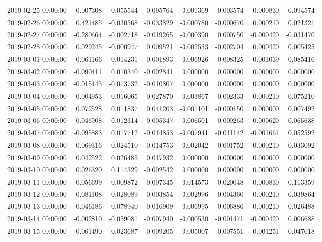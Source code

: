 \begin{tabular}{lrrrrrrr}
2019-02-25 00:00:00 & 0.007308 & 0.055544 & 0.095764 & 0.001369 & 0.003574 & 0.000830 & 0.094574 \\
2019-02-26 00:00:00 & 0.421485 & -0.030568 & -0.033829 & -0.000780 & -0.000670 & 0.000210 & 0.021321 \\
2019-02-27 00:00:00 & -0.280664 & -0.002718 & -0.019265 & -0.000390 & 0.000750 & -0.000420 & -0.031470 \\
2019-02-28 00:00:00 & 0.029245 & -0.000947 & 0.009521 & -0.002533 & -0.002704 & 0.000420 & 0.005425 \\
2019-03-01 00:00:00 & 0.061166 & 0.014231 & 0.001893 & 0.006926 & 0.008325 & 0.001039 & -0.085416 \\
2019-03-02 00:00:00 & -0.090411 & 0.010340 & -0.002841 & 0.000000 & 0.000000 & 0.000000 & 0.000000 \\
2019-03-03 00:00:00 & -0.015443 & -0.013732 & -0.010807 & 0.000000 & 0.000000 & 0.000000 & 0.000000 \\
2019-03-04 00:00:00 & -0.004953 & -0.016065 & -0.027870 & -0.003867 & -0.002333 & -0.000210 & 0.075210 \\
2019-03-05 00:00:00 & 0.072528 & 0.011837 & 0.041203 & -0.001101 & -0.000150 & 0.000000 & 0.007492 \\
2019-03-06 00:00:00 & 0.046908 & -0.012314 & 0.005347 & -0.006501 & -0.009263 & -0.000620 & 0.065638 \\
2019-03-07 00:00:00 & -0.095883 & 0.017712 & -0.014853 & -0.007941 & -0.011142 & -0.001661 & 0.052592 \\
2019-03-08 00:00:00 & 0.069316 & 0.024510 & -0.014753 & -0.002042 & -0.001752 & -0.000210 & -0.033092 \\
2019-03-09 00:00:00 & 0.042522 & 0.026485 & 0.017932 & 0.000000 & 0.000000 & 0.000000 & 0.000000 \\
2019-03-10 00:00:00 & 0.026320 & 0.114329 & -0.002542 & 0.000000 & 0.000000 & 0.000000 & 0.000000 \\
2019-03-11 00:00:00 & -0.056699 & 0.009872 & -0.007345 & 0.014573 & 0.020048 & 0.000830 & -0.113359 \\
2019-03-12 00:00:00 & 0.081108 & 0.028089 & -0.003854 & 0.002996 & 0.004360 & -0.000210 & -0.039864 \\
2019-03-13 00:00:00 & -0.046186 & 0.078940 & 0.016909 & 0.006995 & 0.006886 & -0.000210 & -0.026488 \\
2019-03-14 00:00:00 & -0.002810 & -0.059081 & -0.007940 & -0.000530 & -0.001471 & -0.000420 & 0.006688 \\
2019-03-15 00:00:00 & 0.061490 & -0.023687 & 0.009205 & 0.005007 & 0.007551 & -0.001251 & -0.047018 \\

\end{tabular}
